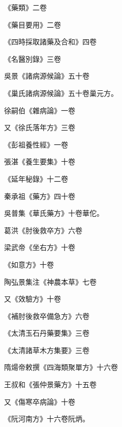 \begin{pinyinscope}
 《藥類》二卷



 《藥目要用》二卷



 《四時採取諸藥及合和》四卷



 《名醫別錄》三卷



 吳景《諸病源候論》五十卷



 《巢氏諸病源候論》五十卷巢元方。



 徐嗣伯《雜病論》一卷



 又《徐氏落年方》三卷



 《彭祖養性經》一卷



 張湛《養生要集》十卷



 《延年秘錄》十二卷



 秦承祖《藥方》四十卷



 吳普集《華氏藥方》十卷華佗。



 葛洪《肘後救卒方》六卷



 梁武帝《坐右方》十卷



 《如意方》十卷



 陶弘景集注《神農本草》七卷



 又《效驗方》十卷



 《補肘後救卒備急方》六卷



 《太清玉石丹藥要集》三卷



 《太清諸草木方集要》三卷



 隋煬帝敕撰《四海類聚單方》十六卷



 王叔和《張仲景藥方》十五卷



 又《傷寒卒病論》十卷



 《阮河南方》十六卷阮炳。




\end{pinyinscope}
